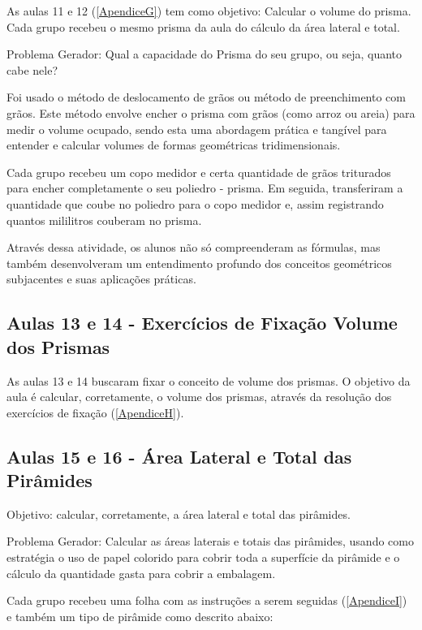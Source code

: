 As aulas 11 e 12 (\autoref{ApendiceG}) tem como objetivo: Calcular o volume do prisma. Cada grupo recebeu o mesmo prisma da aula do cálculo da área lateral e total.

Problema Gerador: Qual a capacidade do Prisma do seu grupo, ou seja, quanto cabe nele?

Foi usado o método de deslocamento de grãos ou método de preenchimento com grãos. Este método envolve encher o prisma com grãos (como arroz ou areia) para medir o volume ocupado, sendo esta uma abordagem prática e tangível para entender e calcular volumes de formas geométricas tridimensionais.

Cada grupo recebeu um copo medidor e  certa quantidade de grãos triturados para encher completamente o seu poliedro - prisma. Em seguida, transferiram a quantidade que coube no poliedro para o copo medidor e, assim registrando quantos mililitros couberam no prisma.

Através dessa atividade, os alunos não só compreenderam as fórmulas, mas também desenvolveram um entendimento profundo dos conceitos geométricos subjacentes e suas aplicações práticas.

\subsection{Aulas 13 e 14 - Exercícios de Fixação Volume dos Prismas}

As aulas 13 e 14 buscaram fixar o conceito de volume dos prismas. O objetivo da aula é calcular, corretamente, o volume dos prismas, através da resolução dos exercícios de fixação (\autoref{ApendiceH}).

\subsection{Aulas 15 e 16 - Área Lateral e Total das Pirâmides}

Objetivo: calcular, corretamente, a área lateral e total das pirâmides.

Problema Gerador: Calcular as áreas laterais e totais das pirâmides, usando como estratégia o uso de papel colorido para cobrir toda a superfície da pirâmide e o cálculo da quantidade gasta para cobrir a embalagem.

Cada grupo recebeu uma folha com as instruções a serem seguidas (\autoref{ApendiceI}) e também um tipo de pirâmide como descrito abaixo:

